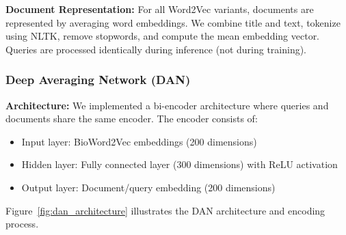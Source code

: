 \documentclass[sigconf,nonacm]{acmart}
\begin{document}
\textbf{Document Representation:} For all Word2Vec variants, documents are represented by averaging word embeddings. We combine title and text, tokenize using NLTK, remove stopwords, and compute the mean embedding vector. Queries are processed identically during inference (not during training).

\subsubsection{Deep Averaging Network (DAN)}
\textbf{Architecture:} We implemented a bi-encoder architecture where queries and documents share the same encoder. The encoder consists of:
\begin{itemize}
    \item Input layer: BioWord2Vec embeddings (200 dimensions)
    \item Hidden layer: Fully connected layer (300 dimensions) with ReLU activation
    \item Output layer: Document/query embedding (200 dimensions)
\end{itemize}

Figure~\ref{fig:dan_architecture} illustrates the DAN architecture and encoding process.
\end{document}
